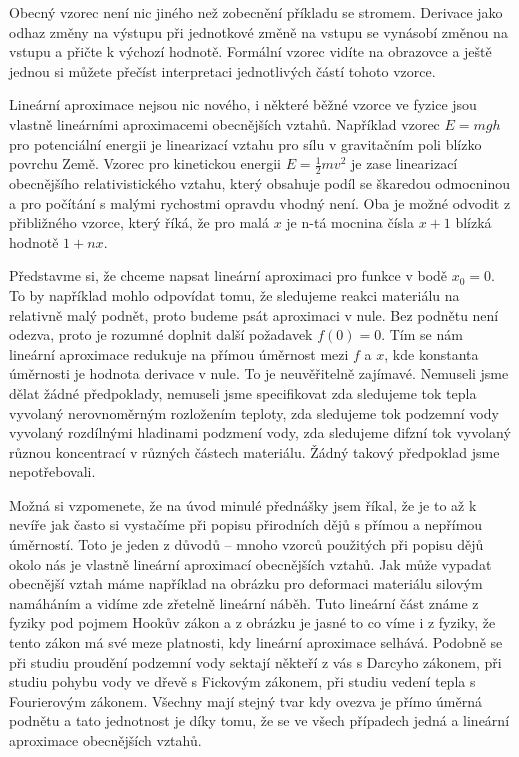 \documentclass[12pt]{article}
\begin{document}
Obecný vzorec není nic jiného než zobecnění příkladu se stromem. Derivace jako odhaz změny na výstupu při jednotkové změně na vstupu se vynásobí změnou na vstupu a přičte k výchozí hodnotě. Formální vzorec vidíte na obrazovce a ještě jednou si můžete přečíst interpretaci jednotlivých částí tohoto vzorce.

Lineární aproximace nejsou nic nového, i některé běžné vzorce ve fyzice jsou vlastně lineárními aproximacemi obecnějších vztahů. Například vzorec $E=mgh$ pro potenciální energii je linearizací vztahu pro sílu v gravitačním poli blízko povrchu Země. Vzorec pro kinetickou energii $E=\frac 12 mv^2$ je zase linearizací obecnějšího relativistického vztahu, který obsahuje podíl se škaredou odmocninou a pro počítání s malými rychostmi opravdu vhodný není. Oba je možné odvodit z přibližného vzorce, který říká, že pro malá $x$ je n-tá mocnina čísla $x+1$ blízká hodnotě $1+nx.$

Představme si, že chceme napsat lineární aproximaci pro funkce v bodě $x_0=0$. To by například mohlo odpovídat tomu, že sledujeme reakci materiálu na relativně malý podnět, proto budeme psát aproximaci v nule. Bez podnětu není odezva, proto je rozumné doplnit další požadavek $f(0)=0$. Tím se nám lineární aproximace redukuje na přímou úměrnost mezi $f$ a $x$, kde konstanta úměrnosti je hodnota derivace v nule. To je neuvěřitelně zajímavé. Nemuseli jsme dělat žádné předpoklady, nemuseli jsme specifikovat zda sledujeme tok tepla vyvolaný nerovnoměrným rozložením teploty, zda sledujeme tok podzemní vody vyvolaný rozdílnými hladinami podzmení vody, zda sledujeme difzní tok vyvolaný různou koncentrací v různých částech materiálu. Žádný takový předpoklad jsme nepotřebovali.

Možná si vzpomenete, že na úvod minulé přednášky jsem říkal, že je to až k nevíře jak často si vystačíme při popisu přirodních dějů s přímou a nepřímou úměrností. Toto je jeden z důvodů -- mnoho vzorců použitých při popisu dějů okolo nás je vlastně lineární aproximací obecnějších vztahů. Jak může vypadat obecnější vztah máme například na obrázku pro deformaci materiálu silovým namáháním a vidíme zde zřetelně lineární náběh. Tuto lineární část známe z fyziky pod pojmem Hookův zákon a z obrázku je jasné to co víme i z fyziky, že tento zákon má své meze platnosti, kdy lineární aproximace selhává. Podobně se při studiu proudění podzemní vody sektají někteří z vás s Darcyho zákonem, při studiu pohybu vody ve dřevě s Fickovým zákonem, při studiu vedení tepla s Fourierovým zákonem. Všechny mají stejný tvar kdy ovezva je přímo úměrná podnětu a tato jednotnost je díky tomu, že se ve všech případech jedná a lineární aproximace obecnějších vztahů.
\end{document}
